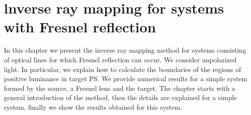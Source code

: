 \chapter{lnverse ray mapping for systems with Fresnel reflection}
\label{chap:fresnel}

In this chapter we present the inverse ray mapping method for systems consisting of optical lines for which Fresnel reflection can occur. We consider unpolarized light. In particular, we explain how to calculate the boundaries of the regions of positive luminance in target PS. We provide numerical results for a simple system formed by the source, a Fresnel lens and the target. 
The chapter starts with a general introduction of the method, then the details are explained for a simple system, finally we show the results obtained for this system.
